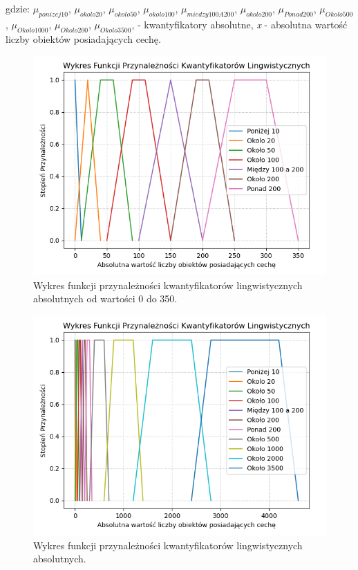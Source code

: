 \documentclass{classrep}
\begin{document}
gdzie: \(\mu _{ponizej10}\), \(\mu _{okolo20}\), \(\mu _{okolo50}\), \(\mu _{okolo100}\), \(\mu _{miedzy100A200}\), \(\mu _{okolo200}\), \(\mu _{Ponad200}\),  \(\mu _{Okolo500}\), \(\mu _{Okolo1000}\),  \(\mu _{Okolo200}\), \(\mu _{Okolo3500}\),  - kwantyfikatory absolutne, \textit{x} - absolutna wartość liczby obiektów posiadających cechę. 

\begin{figure}[h!]
 \centering
 \includegraphics[width=14cm]{kwantyfikatory_absolutny_2.png}
 \vspace{-0.3cm}
 \caption{Wykres funkcji przynależności kwantyfikatorów lingwistycznych absolutnych od wartości 0 do 350. }
 \label{kwantyfikatory_lingwistyczne_absolutne}
\end{figure}


\begin{figure}[h!]
 \centering
 \includegraphics[width=14cm]{kwantyfikatory_absolutny.png}
 \vspace{-0.3cm}
 \caption{Wykres funkcji przynależności kwantyfikatorów lingwistycznych absolutnych. }
 \label{kwantyfikatory_lingwistyczne_absolutne}
\end{figure}
\newpage
\end{document}
